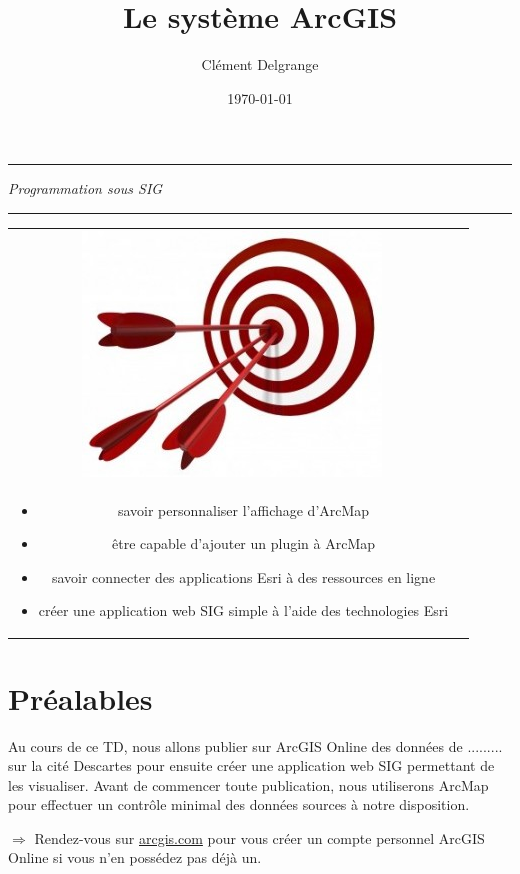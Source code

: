 \documentclass[11pt]{article}
\title{Le système ArcGIS}
\author{Clément Delgrange}
\date{\today}
\newcommand{\action}{$\Rightarrow$ }
\newenvironment{objectifs}{
	\begin{lrbox}{\mybox}
		\begin{minipage}{0.9\textwidth}
			\vspace{1em}
			\begin{tabular}[t t]{c c}
				\includegraphics[width=0.1\linewidth]{img/goals.jpg} &
				\begin{minipage}[c]{0.8\linewidth}
					\hspace{2em}\textbf{\large{Objectifs :}} \\
}{
				\end{minipage}
			\end{tabular}
			\vspace{1em}
		\end{minipage}
	\end{lrbox}
	\fbox{\usebox{\mybox}}
}
\begin{document}
\parindent=0cm

\makeatletter
\begin{center}
	\hrule
	\vspace{1em}
	{\small \textit{Programmation sous SIG}}\\	
	\vspace{0.5em}
	{\Large \bfseries{\@title}}
	\vspace{1em}
	\hrule
\end{center}
\makeatother


\begin{objectifs}
	\begin{itemize}
		\item savoir personnaliser l'affichage d'ArcMap
		\item être capable d'ajouter un plugin à ArcMap
		\item savoir connecter des applications Esri à des ressources en ligne
		\item créer une application web SIG simple à l'aide des technologies Esri
	\end{itemize}
\end{objectifs}




\section*{Préalables}

Au cours de ce TD, nous allons publier sur ArcGIS Online des données de ......... sur la cité Descartes pour ensuite créer une application web SIG permettant de les visualiser. Avant de commencer toute publication, nous utiliserons ArcMap pour effectuer un contrôle minimal des données sources à notre disposition.
 
\action Rendez-vous sur \url{arcgis.com} pour vous créer un compte personnel ArcGIS Online si vous n'en possédez pas déjà un.
\end{document}
